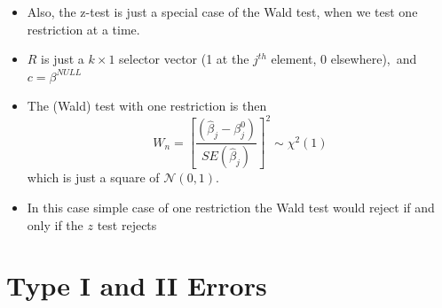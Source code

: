 \documentclass[notes=show]{beamer}
\begin{document}
\begin{frame}%


\begin{itemize}
\item Also, the z-test is just a special case of the Wald test, when we test
one restriction at a time.

\item $R$ is just a $k\times 1$ selector vector (1 at the $j^{th}$ element,
0 elsewhere),\ and $c=\beta ^{NULL}$

\item The (Wald) test with one restriction is then%
\begin{equation}
W_{n}=\left[ \frac{(\hat{\beta}_{j}-\beta _{j}^{0})}{SE\left( \hat{\beta}%
_{j}\right) }\right] ^{2}\sim \chi ^{2}\left( 1\right)  \label{W11}
\end{equation}%
which is just a square of $\mathcal{N}\left( 0,1\right) .$

\item In this case simple case of one restriction the Wald test would reject
if and only if the $z$ test rejects
\end{itemize}

\end{frame}%

\section{Type I and II Errors}
\end{document}
